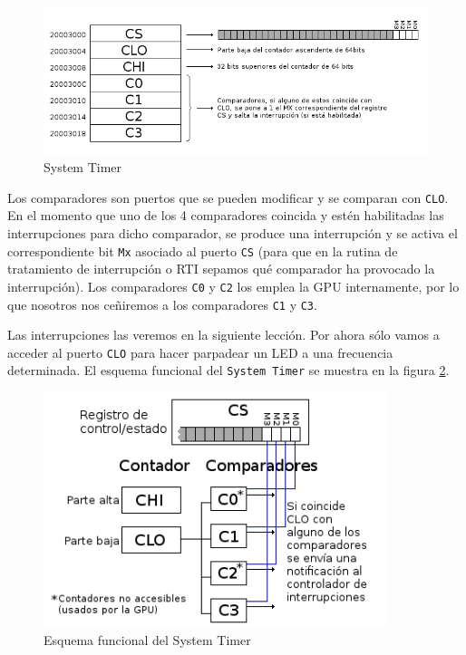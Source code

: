 \begin{figure}[h]
  \centering
    \includegraphics[width=14cm]{graphs/systemtimer.png}
  \caption{System Timer}
  \label{fig:systim}
\end{figure}

Los comparadores son puertos que se pueden modificar y se comparan con {\tt CLO}. En el momento
que uno de los 4 comparadores coincida y estén habilitadas las interrupciones para dicho
comparador, se produce una interrupción y se activa el correspondiente bit {\tt Mx}
asociado al puerto {\tt CS} (para que en la rutina de tratamiento de interrupción o RTI
sepamos qué comparador ha provocado la interrupción).
Los comparadores {\tt C0} y {\tt C2} los emplea la GPU internamente, por lo que nosotros nos
ceñiremos a los comparadores {\tt C1} y {\tt C3}.

Las interrupciones las veremos en la siguiente lección. Por ahora sólo vamos
a acceder al puerto {\tt CLO} para hacer parpadear un LED a una frecuencia determinada. El
esquema funcional del {\tt System Timer} se muestra en la figura \ref{fig:esqtim}.

\begin{figure}[h]
  \centering
    \includegraphics[width=10cm]{graphs/esquematimer.png}
  \caption{Esquema funcional del System Timer}
  \label{fig:esqtim}
\end{figure}


